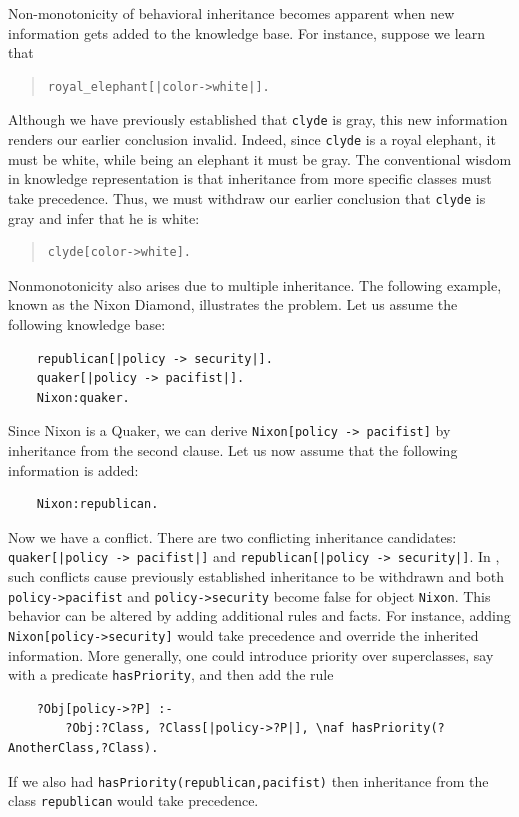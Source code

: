 \documentclass[11pt]{article}
\newcommand{\ERGO}{\mbox{\smaller{\ensuremath{\cal{E}}\smaller{{\sc{RGO}}}}}\xspace}
\newcommand{\FLSYSTEM}{\ERGO}
\begin{document}
Non-monotonicity of behavioral inheritance becomes apparent when new
information gets added to the knowledge base. For instance, suppose we
learn that
\begin{quote}
\begin{verbatim}
royal_elephant[|color->white|].  
\end{verbatim}
\end{quote}
Although we have previously established that {\tt clyde} is gray, this
new information renders our earlier conclusion invalid. Indeed, since
{\tt clyde} is a royal elephant, it must be white, while being an
elephant it must be gray.  The conventional wisdom in knowledge
representation is that inheritance from more specific classes
must take precedence. Thus, we must withdraw our earlier conclusion
that {\tt clyde} is gray and infer that he is white:
\begin{quote}
\begin{verbatim}
clyde[color->white].    
\end{verbatim}
\end{quote}

Nonmonotonicity also arises due to multiple inheritance. The following
example, known as the Nixon Diamond, illustrates the problem. Let us assume
the following knowledge base:
\begin{verbatim}
    republican[|policy -> security|].
    quaker[|policy -> pacifist|].
    Nixon:quaker.
\end{verbatim}
Since Nixon is a Quaker, we can derive {\tt Nixon[policy -> pacifist]}
by inheritance from the second clause. Let us now assume that the following
information is added:
\begin{verbatim}
    Nixon:republican.  
\end{verbatim}
Now we have a conflict. There are two conflicting inheritance candidates:
{\tt quaker[|policy -> pacifist|]} and {\tt republican[|policy ->
  security|]}.  In \FLSYSTEM, such conflicts cause previously
established inheritance to be withdrawn and both {\tt
  policy->pacifist} and \texttt{policy->security} 
become false for object {\tt Nixon}.  This behavior can be
altered by adding additional rules and facts. For instance, adding {\tt
  Nixon[policy->security]} would take precedence and override the
inherited information. More generally, one could introduce priority over
superclasses, say with a predicate {\tt hasPriority}, and then add the rule
\begin{verbatim}
    ?Obj[policy->?P] :-
        ?Obj:?Class, ?Class[|policy->?P|], \naf hasPriority(?AnotherClass,?Class).
\end{verbatim}
If we also had {\tt hasPriority(republican,pacifist)} then inheritance from
the class {\tt republican} would take precedence. 
\end{document}
